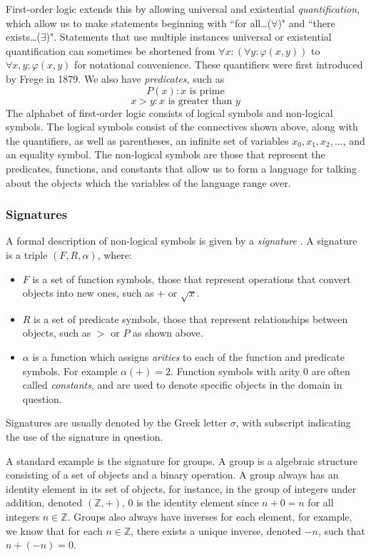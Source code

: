 \documentclass[11pt]{article}
\theoremstyle{definition}
\theoremstyle{theorem}
\theoremstyle{lemma}
\begin{document}
First-order logic extends this by allowing universal and existential \emph{quantification}, which allow us to make statements beginning with ``for all\ldots ($\forall$)" and ``there exists\ldots ($\exists$)". Statements that use multiple instances universal or existential quantification can sometimes be shortened from $\forall x:(\forall y: \varphi(x,y))$ to $\forall x,y: \varphi(x,y)$ for notational convenience.
These quantifiers were first introduced by Frege \cite{frege} in 1879.
We also have \emph{predicates}, such as
$$P(x) : x \text{ is prime}$$
$$ x > y : x \text{ is greater than } y$$
\noindent
The alphabet of first-order logic consists of logical symbols and non-logical symbols.
The logical symbols consist of the connectives shown above, along with the quantifiers, as well as parentheses, an infinite set of variables $x_0, x_1, x_2,\ldots$, and an equality symbol.
The non-logical symbols are those that represent the predicates, functions, and constants that allow us to form a language for talking about the objects which the variables of the language range over.

\subsubsection{Signatures}
A formal description of non-logical symbols is
given by a \emph{signature} \cite[ch. 1.1]{selinger}. A signature is a triple $(F,R,\alpha)$, where:
\begin{itemize}
\item $F$ is a set of function symbols, those that represent operations that convert objects into new ones, such as $+$ or $\sqrt{x}$.
\item $R$ is a set of predicate symbols, those that represent relationships between objects, such as $>$ or $P$ as shown above.
\item $\alpha$ is a function which assigns \emph{arities} to each of the function and predicate symbols.
For example $\alpha(+) = 2$. Function symbols with arity $0$ are often called \emph{constants}, and are used to denote specific objects in the domain in question.
\end{itemize}
Signatures are usually denoted by the Greek letter $\sigma$, with subscript indicating the use of the signature in question.

A standard example is the signature for groups.
A group is a algebraic structure consisting of a set of objects and a binary operation.
A group always has an identity element in its set of objects, for instance, in the group of integers under addition, denoted $(\mathbb{Z}, +)$, $0$ is the identity element since $n + 0 = n$ for all integers $n\in\mathbb{Z}$.
Groups also always have inverses for each element, for example, we know that for each $n\in\mathbb{Z}$, there exists a unique inverse, denoted $-n$, such that $n + (-n) = 0$.
\end{document}
